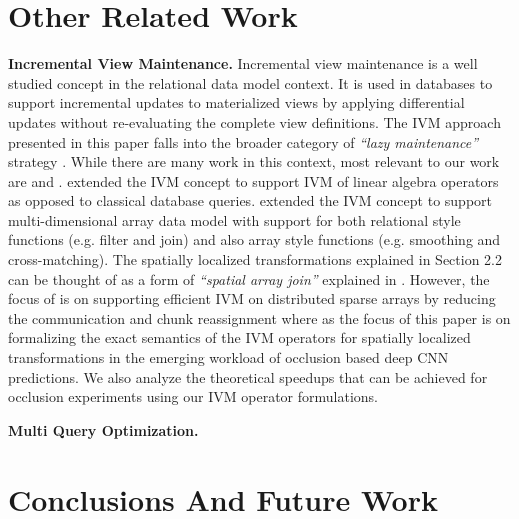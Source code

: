 \documentclass[10pt, sigconf]{acmart}
\begin{document}






\section{Other Related Work}

\vspace{2mm}
\noindent \textbf{Incremental View Maintenance.} Incremental view maintenance \cite{chirkova2012materialized,gupta1995maintenance,levy1995answering} is a well studied concept in the relational data model context.
It is used in databases to support incremental updates to materialized views by applying differential updates without re-evaluating the complete view definitions.
The IVM approach presented in this paper falls into the broader category of \textit{``lazy maintenance''} strategy \cite{chirkova2012materialized}.
While there are many work in this context, most relevant to our work are \cite{nikolic2014linview} and \cite{zhao2017incremental}.
\cite{nikolic2014linview} extended the IVM concept to support IVM of linear algebra operators as opposed to classical database queries.
\cite{zhao2017incremental} extended the IVM concept to support multi-dimensional array data model with support for both relational style functions (e.g. filter and join) and also array style functions (e.g. smoothing and cross-matching).
The spatially localized transformations explained in Section 2.2 can be thought of as a form of \textit{``spatial array join''} explained in \cite{zhao2017incremental}.
However, the focus of \cite{zhao2017incremental} is on supporting efficient IVM on distributed sparse arrays by reducing the communication and chunk reassignment where as the focus of this paper is on formalizing the exact semantics of the IVM operators for spatially localized transformations in the emerging workload of occlusion based deep CNN predictions.
We also analyze the theoretical speedups that can be achieved for occlusion experiments using our IVM operator formulations.

\vspace{2mm}
\noindent \textbf{Multi Query Optimization.}


\section{Conclusions And Future Work}





\end{document}
